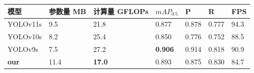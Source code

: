 \begin{table}[htbp]
    \centering
    \captionsetup{font=footnotesize}
    \label{tab:compare_studies_tt100k}
    \begin{tabular}{p{}p{}p{}p{}p{}p{}p{}}
        \toprule
        模型       & 参数量 MB & 计算量 GFLOPs & $mAP_{0.5}$   & P     & R     & FPS \\ 
        \midrule
        YOLOv11s     & 9.5           & 21.8          & 0.877          & 0.878  & 0.777 & 94.3 \\
        YOLOv10s     & 8.2           & 25.4          & 0.850          & 0.776  & 0.752 & 88.5 \\
        YOLOv9s      & 7.5           & 27.2          & \textbf{0.906} & 0.914  & 0.818 & 90.9 \\
        \textbf{our} & 11.4          & \textbf{17.0} & 0.893          & 0.875  & 0.830 & 84.7 \\
        \bottomrule
    \end{tabular}
\end{table}

